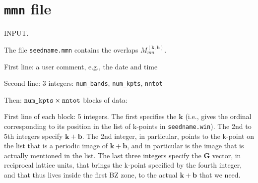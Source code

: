 %
%
%
%

\section{{\tt mmn} file} 

INPUT. 

The file \verb#seedname.mmn# contains the overlaps
$M_{mn}^{(\mathbf{k,b})}$.

First line: a user comment, e.g., the date and time

Second line: 3 integers: \verb#num_bands#, \verb#num_kpts#,
\verb#nntot#

Then: $\verb#num_kpts#\times\verb#nntot#$ blocks of data:
 
First line of each block: 5 integers. The first specifies the
$\mathbf{k}$ (i.e., gives the ordinal corresponding to its position in
the list  of k-points in \verb#seedname.win#). The 2nd to 5th integers
specify $\mathbf{k+b}$. The  2nd integer, in particular, points to the
k-point on the list that is a  periodic image of $\mathbf{k+b}$, and
in particular is the image that is actually mentioned in the list. The 
last three integers specify the $\mathbf{G}$ vector, in  reciprocal
lattice units, that brings the k-point specified by the fourth
integer, and that thus lives inside the first BZ zone, to the actual
$\mathbf{k+b}$ that we need.

